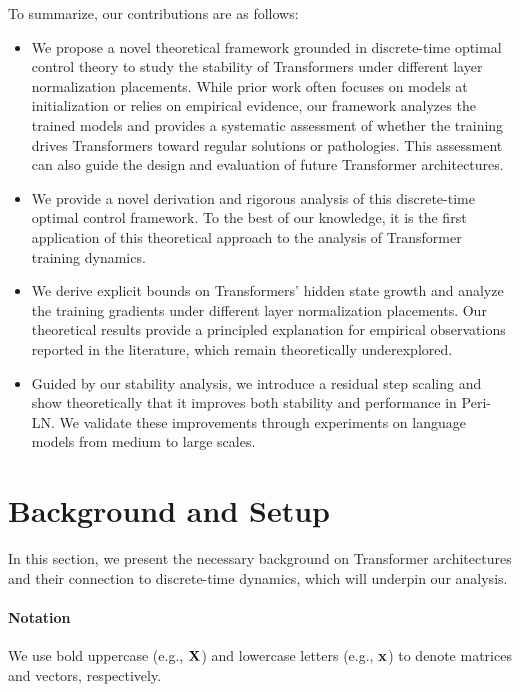 \documentclass[journal]{IEEEtran}
\newcommand{\bfX}{{\bf X}}
\newcommand{\bfx}{{\bf x}}
\theoremstyle{plain}
\theoremstyle{definition}
\theoremstyle{remark}
\begin{document}
To summarize, our contributions are as follows:
\begin{itemize}
    \item We propose a novel theoretical framework grounded in discrete-time optimal control theory to study the stability of Transformers under different layer normalization placements. While prior work often focuses on models at initialization or relies on empirical evidence, our framework analyzes the trained models and provides a systematic assessment of whether the training drives Transformers toward regular solutions or pathologies. This assessment can also guide the design and evaluation of future Transformer architectures.
    \item We provide a novel derivation and rigorous analysis of this discrete-time optimal control framework. To the best of our knowledge, it is the first application of this theoretical approach to the analysis of Transformer training dynamics.
    \item We derive explicit bounds on Transformers' hidden state growth and analyze the training gradients under different layer normalization placements. Our theoretical results provide a principled explanation for empirical observations reported in the literature, which remain theoretically underexplored.
    \item Guided by our stability analysis, we introduce a residual step scaling and show theoretically that it improves both stability and performance in Peri-LN. We validate these improvements through experiments on language models from medium to large scales.
\end{itemize}



\section{Background and Setup}\label{sec:background}
In this section, we present the necessary background on Transformer architectures and their connection to discrete-time dynamics, which will underpin our analysis.
\paragraph{Notation} 
We use bold uppercase (e.g., $\bfX$) and lowercase letters (e.g., $\bfx$) to denote matrices and vectors, respectively.
\end{document}
